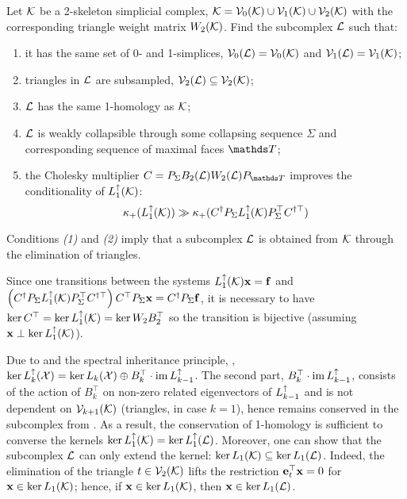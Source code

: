 \begin{problem}
      \label{prob:subcomplex}
      Let \( \mathcal{K} \) be a 2-skeleton simplicial complex, \( \mathcal{K} = \mathcal{V}_{0}(\mathcal{K}) \cup \mathcal{V}_{1}(\mathcal{K}) \cup \mathcal{V}_{2}(\mathcal{K})\) with the corresponding triangle weight matrix \( W_2(\mathcal{K} ) \). Find the subcomplex \( \mathcal{L} \) such that:
      \begin{enumerate}[leftmargin = 45pt, label=(\arabic*) ]
            \item it has the same set of 0- and 1-simplices, \( \mathcal{V}_0(\mathcal{L}) = \mathcal{V}_{0}(\mathcal{K}) \) and \( \mathcal{V}_1(\mathcal{L}) = \mathcal{V}_{1}(\mathcal{K}) \);  
            \item triangles in \( \mathcal{L} \) are subsampled, \( \mathcal{V}_2(\mathcal{L} ) \subseteq \mathcal{V}_{2}(\mathcal{K}) \);
            \item \( \mathcal{L} \) has the same 1-homology as \( \mathcal{K} \);
            \item \( \mathcal{L} \) is weakly collapsible through some  collapsing sequence \( \Sigma \) and corresponding sequence of maximal faces \( \ds T \);
            \item the Cholesky multiplier \( C = P_\Sigma B_2 (\mc L ) W_2(\mc L) P_{\ds T }\) improves the conditionality of \( L_{1}^{\uparrow} (\mathcal{K} )\): 
            \begin{equation*}
                  \kappa_+ ( L_{1}^{\uparrow} (\mathcal{K}) ) \gg \kappa_+ ( C^\dagger P_\Sigma L_{1}^{\uparrow} (\mathcal{K} ) P_\Sigma^\top C^{\dagger \top}  )
            \end{equation*}
      \end{enumerate}
\end{problem}

Conditions \emph{(1)} and \emph{(2)} imply that a subcomplex \( \mathcal{L} \) is obtained from \( \mathcal{K} \) through the elimination of triangles.
\begin{remark}
      Since one transitions between the systems \( L_{1}^{\uparrow} ( \mathcal{K} ) \mathbf{x} = \mathbf{f} \) and \( \left( C^\dagger P_\Sigma L_{1}^{\uparrow} (\mathcal{K} ) P_\Sigma^\top C^{\dagger \top} \right) C^\top P_\Sigma \mathbf{x} = C^\dagger P_\Sigma \mathbf{f}  \), it is necessary to have \( \ker C^\top = \ker L_{1}^{\uparrow}(\mathcal{K})  = \ker W_2 B_2^\top \) so the transition is bijective (assuming \( \mathbf{x} \perp \ker L_{1}^{\uparrow} (\mathcal{K} )\)). 

      Due to  and the spectral inheritance principle, {\cite[Thm.~2.7]{guglielmi2023quantifying}}, 
      \( \ker L_{k}^{\uparrow} (\mathcal{X} ) = \ker L_k (\mathcal{X} ) \oplus B_{k}^\top  \cdot \operatorname{im} L_{k-1}^{\uparrow} \).  The second part, \( B_{k}^\top  \cdot \operatorname{im} L_{k-1}^{\uparrow} \), consists of the action of \( B_{k}^\top \) on non-zero related eigenvectors of \( L_{k-1}^{\uparrow}\) and is not dependent on \( \mathcal{V}_{k+1}(\mathcal{K}) \) (triangles, in case \( k =1 \)), hence remains conserved in the subcomplex from . As a result, the conservation of 1-homology is sufficient to converse the kernels \( \ker L_{1}^{\uparrow} ( \mathcal{K} ) = \ker L_{1}^{\uparrow} ( \mathcal{L} ) \).
      Moreover, one can show that the subcomplex \( \mathcal{L} \) can only extend the kernel: \( \ker L_1 (\mathcal{K}) \subseteq \ker L_1 ( \mathcal{L} )\). Indeed, the elimination of the triangle \(t \in \mathcal{V}_{2}(\mathcal{K}) \) lifts the restriction \( \mathbf{e}_t^\top \mathbf{x} = 0\) for \( \mathbf{x} \in \ker L_1 (\mathcal{K})\); hence, if \( \mathbf{x} \in \ker L_1( \mathcal{K} )\), then \( \mathbf{x} \in \ker L_1(\mathcal{L})\).
\end{remark}


